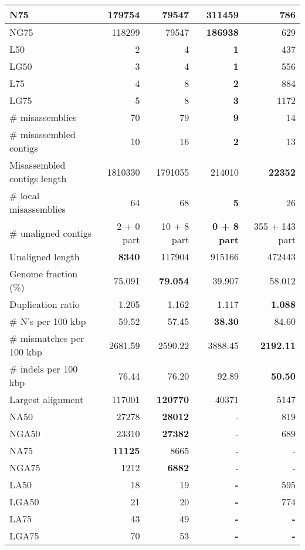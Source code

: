 \documentclass[12pt,a4paper]{article}
\begin{document}
\begin{table}[ht]
\begin{center}
\begin{tabular}{|l*{4}{|r}|}
N75 & 179754 & 79547 & {\bf 311459} & 786 \\ \hline
NG75 & 118299 & 79547 & {\bf 186938} & 629 \\ \hline
L50 & 2 & 4 & {\bf 1} & 437 \\ \hline
LG50 & 3 & 4 & {\bf 1} & 556 \\ \hline
L75 & 4 & 8 & {\bf 2} & 884 \\ \hline
LG75 & 5 & 8 & {\bf 3} & 1172 \\ \hline
\# misassemblies & 70 & 79 & {\bf 9} & 14 \\ \hline
\# misassembled contigs & 10 & 16 & {\bf 2} & 13 \\ \hline
Misassembled contigs length & 1810330 & 1791055 & 214010 & {\bf 22352} \\ \hline
\# local misassemblies & 64 & 68 & {\bf 5} & 26 \\ \hline
\# unaligned contigs & 2 + 0 part & 10 + 8 part & {\bf 0 + 8 part} & 355 + 143 part \\ \hline
Unaligned length & {\bf 8340} & 117904 & 915166 & 472443 \\ \hline
Genome fraction (\%) & 75.091 & {\bf 79.054} & 39.907 & 58.012 \\ \hline
Duplication ratio & 1.205 & 1.162 & 1.117 & {\bf 1.088} \\ \hline
\# N's per 100 kbp & 59.52 & 57.45 & {\bf 38.30} & 84.60 \\ \hline
\# mismatches per 100 kbp & 2681.59 & 2590.22 & 3888.45 & {\bf 2192.11} \\ \hline
\# indels per 100 kbp & 76.44 & 76.20 & 92.89 & {\bf 50.50} \\ \hline
Largest alignment & 117001 & {\bf 120770} & 40371 & 5147 \\ \hline
NA50 & 27278 & {\bf 28012} & - & 819 \\ \hline
NGA50 & 23310 & {\bf 27382} & - & 689 \\ \hline
NA75 & {\bf 11125} & 8665 & - & - \\ \hline
NGA75 & 1212 & {\bf 6882} & - & - \\ \hline
LA50 & 18 & 19 & {\bf -} & 595 \\ \hline
LGA50 & 21 & 20 & {\bf -} & 774 \\ \hline
LA75 & 43 & 49 & {\bf -} & {\bf -} \\ \hline
LGA75 & 70 & 53 & {\bf -} & {\bf -} \\ \hline
\end{tabular}
\end{center}
\end{table}
\end{document}
